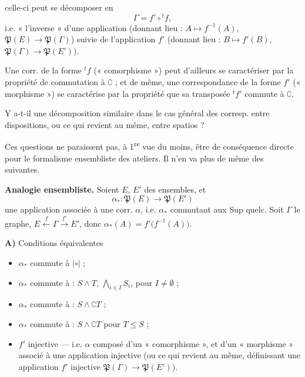 \documentclass[11pt,a4paper]{article}
\begin{document}


celle-ci peut se décomposer en
\[
  \Gamma = f' \circ {}^{t}f ,
\]
i.e. « l'inverse » d'une application (donnant lieu : $A \mapsto f^{-1}(A)$, $\mathfrak{P}(E) \to \mathfrak{P}(\Gamma)$) suivie de l'application $f'$ (donnant lieu : $B \mapsto f'(B)$, $\mathfrak{P}(\Gamma) \to \mathfrak{P}(E')$).

Une corr. de la forme ${}^{t}f$ \struck{\ill{}} (« comorphisme ») peut d'ailleurs se caractériser  par la propriété de commutation à $\complement$ ; et de même, une correspondance de la forme $f'$ (« morphisme ») se caractérise par la propriété que sa transposée ${}^{t}f'$ commute à $\complement$.

Y a-t-il une décomposition similaire dans le cas général des corresp.  entre dispositions, ou ce qui revient au même, entre spatios ?

Ces questions ne paraissent pas, à 1\textsuperscript{re} vue du moins, être de conséquence directe pour le formalisme ensembliste des ateliers. Il n'en va plus de même des suivantes.

\textbf{Analogie ensembliste.} Soient $E$, $E'$ des ensembles, et
\[
  \alpha_*\colon \mathfrak{P}(E) \to \mathfrak{P}(E')
\]
une application associée à une corr. $\alpha$, i.e. $\alpha_*$ commutant aux Sup quelc. Soit $\Gamma$ le graphe, \struck{\ill{}} $E \xleftarrow{f} \Gamma \xrightarrow{f'} E'$, donc $\alpha_*(A) = f'\bigl(f^{-1}(A)\bigr)$.

\textbf{A)} Conditions équivalentes
\begin{itemize}
  \item[(i)] $\alpha_*$ commute à $\mathbin{|\circ|}$ ;
  \item[(ii)] $\alpha_*$ commute à : $S \wedge T$, $\bigwedge_{i\in I} S_i$, pour $I \ne \emptyset$ ;
  \item[(ii$'$)] $\alpha_*$ commute à : $S \wedge \complement T$ ;
  \item[(iii$'$)] $\alpha_*$ commute à : $S \wedge \complement T$ pour $T \le S$ ;
  \item[(iv)] $f'$ injective --- i.e. $\alpha$ composé d'un « comorphisme », et d'un « morphisme » associé à une application injective (ou ce qui revient au même, définissant une application $f'$ injective $\mathfrak{P}(\Gamma) \to \mathfrak{P}(E')$).
\end{itemize}
\end{document}
